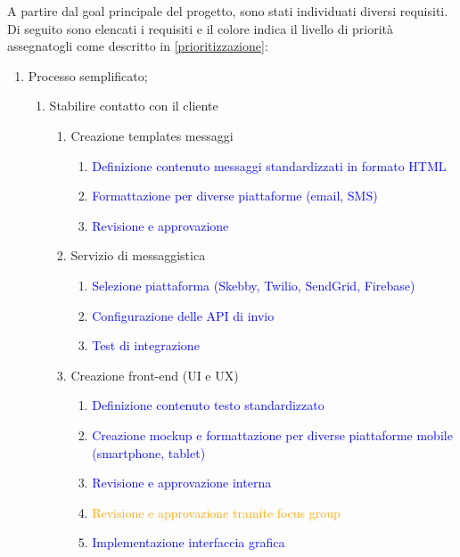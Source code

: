 \documentclass[a4paper,12pt, openright]{report}
\begin{document}
A partire dal goal principale del progetto, sono stati individuati diversi requisiti.
Di seguito sono elencati i requisiti e il colore indica il livello di priorità assegnatogli come descritto in \ref{prioritizzazione}:
\begin{enumerate}
    \item Processo semplificato;
    \begin{enumerate}
        \item Stabilire contatto con il cliente
        \begin{enumerate}
            \item Creazione templates messaggi
            \begin{enumerate}
                \item \textcolor{blue}{Definizione contenuto messaggi standardizzati in formato HTML}
                \item \textcolor{blue}{Formattazione per diverse piattaforme (email, SMS)}
                \item \textcolor{blue}{Revisione e approvazione}
            \end{enumerate}
            \item Servizio di messaggistica
            \begin{enumerate}
                \item \textcolor{blue}{Selezione piattaforma (Skebby, Twilio, SendGrid, Firebase)}
                \item \textcolor{blue}{Configurazione delle API di invio}
                \item \textcolor{blue}{Test di integrazione}
            \end{enumerate}
            \item Creazione front-end (UI e UX)
            \begin{enumerate}
                \item \textcolor{blue}{Definizione contenuto testo standardizzato}
                \item \textcolor{blue}{Creazione mockup e formattazione per diverse piattaforme mobile (smartphone, tablet)}
                \item \textcolor{blue}{Revisione e approvazione interna}
                \item \textcolor{orange}{Revisione e approvazione tramite focus group}
                \item \textcolor{blue}{Implementazione interfaccia grafica}
            \end{enumerate}

\end{enumerate}
\end{enumerate}
\end{enumerate}
\end{document}
